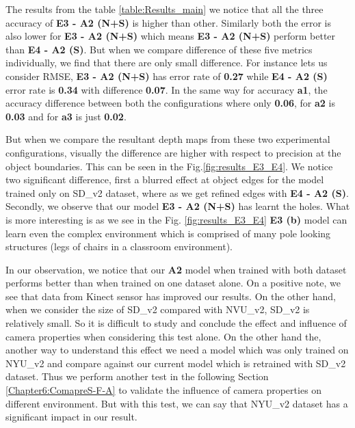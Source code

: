 The results from the table \ref{table:Results_main} we notice that all the three accuracy of \textbf{E3 - A2 (N+S)} is higher than other. Similarly both the error is also lower for \textbf{E3 - A2 (N+S)} which means \textbf{E3 - A2 (N+S)} perform better than  \textbf{E4 - A2 (S)}. But when we compare difference of these five metrics individually, we find that there are only small difference. For instance lets us consider RMSE, \textbf{E3 - A2 (N+S)} has error rate of \textbf{0.27} while \textbf{E4 - A2 (S)} error rate is \textbf{0.34} with difference \textbf{0.07}. In the same way for accuracy \textbf{a1}, the accuracy difference between both the configurations where only \textbf{0.06}, for \textbf{a2} is \textbf{0.03} and for \textbf{a3} is just \textbf{0.02}. 

But when we compare the resultant depth maps from these two experimental configurations, visually the difference are higher with respect to precision at the object boundaries. This can be seen in the Fig.\ref{fig:results_E3_E4}. We notice two significant difference, first a blurred effect at object edges for the model trained only on SD\_v2 dataset, where as we get refined edges with \textbf{E4 - A2 (S)}. Secondly, we observe that our model \textbf{E3 - A2 (N+S)} has learnt the holes. What is more interesting is as we see in the Fig. \ref{fig:results_E3_E4} \textbf{E3 (b)} model can learn even the complex environment which is comprised of many pole looking structures (legs of chairs in a classroom environment).

In our observation, we notice that our \textbf{A2} model when trained with both dataset performs better than when trained on one dataset alone. On a positive note, we see that data from Kinect sensor has improved our results. On the other hand, when we consider the size of SD\_v2 compared with NVU\_v2, SD\_v2 is relatively small. So it is difficult to study and conclude the effect and influence of camera properties when considering this test alone. On the other hand the, another way to understand this effect we need a model which was only trained on NYU\_v2 and compare against our current model which is retrained with SD\_v2 dataset. Thus we perform another test in the following Section \ref{Chapter6:ComapreS-F-A} to validate the influence of camera properties on different environment. But with this test, we can say that NYU\_v2 dataset has a significant impact in our result.

